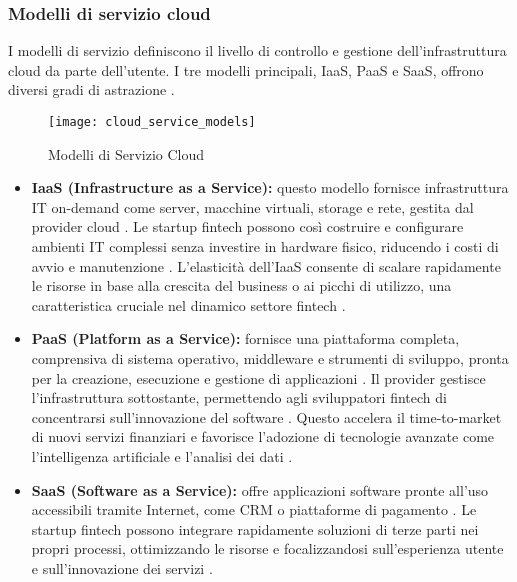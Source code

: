 \subsubsection{Modelli di servizio cloud}

I modelli di servizio definiscono il livello di controllo e gestione dell'infrastruttura cloud da parte dell'utente. I tre modelli principali, IaaS, PaaS e SaaS, offrono diversi gradi di astrazione \cite{redhat2025cloud}.

\begin{figure}[h]
    \centering
    \texttt{[image: cloud\_service\_models]}
    \caption{Modelli di Servizio Cloud}
    \label{fig:service_models}
\end{figure}

\begin{itemize}
    \item \textbf{IaaS (Infrastructure as a Service):} questo modello fornisce infrastruttura IT on-demand come server, macchine virtuali, storage e rete, gestita dal provider cloud \cite{redhat2025cloud}. Le startup fintech possono così costruire e configurare ambienti IT complessi senza investire in hardware fisico, riducendo i costi di avvio e manutenzione \cite{vats2024systematic}. L'elasticità dell'IaaS consente di scalare rapidamente le risorse in base alla crescita del business o ai picchi di utilizzo, una caratteristica cruciale nel dinamico settore fintech \cite{vats2024systematic, hrmars2025cloud}.
    
    \item \textbf{PaaS (Platform as a Service):} fornisce una piattaforma completa, comprensiva di sistema operativo, middleware e strumenti di sviluppo, pronta per la creazione, esecuzione e gestione di applicazioni \cite{redhat2025cloud}. Il provider gestisce l'infrastruttura sottostante, permettendo agli sviluppatori fintech di concentrarsi sull'innovazione del software \cite{vats2024systematic}. Questo accelera il time-to-market di nuovi servizi finanziari e favorisce l'adozione di tecnologie avanzate come l'intelligenza artificiale e l'analisi dei dati \cite{vats2024systematic}.
    
    \item \textbf{SaaS (Software as a Service):} offre applicazioni software pronte all'uso accessibili tramite Internet, come CRM o piattaforme di pagamento \cite{redhat2025cloud}. Le startup fintech possono integrare rapidamente soluzioni di terze parti nei propri processi, ottimizzando le risorse e focalizzandosi sull'esperienza utente e sull'innovazione dei servizi \cite{vats2024systematic}.
\end{itemize}

